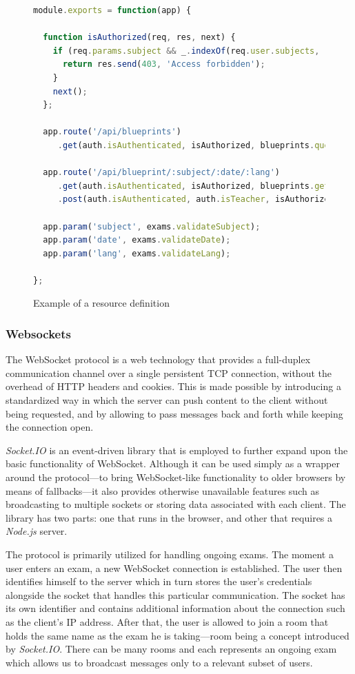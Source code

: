\documentclass[thesis=M,english,hidelinks]{FITthesis}[2012/10/20]
\begin{document}
\begin{figure}
  \begin{lstlisting}[language=JavaScript]
module.exports = function(app) {

  function isAuthorized(req, res, next) {
    if (req.params.subject && _.indexOf(req.user.subjects, req.params.subject) === -1) {
      return res.send(403, 'Access forbidden');
    }
    next();
  };

  app.route('/api/blueprints')
     .get(auth.isAuthenticated, isAuthorized, blueprints.query);

  app.route('/api/blueprint/:subject/:date/:lang')
     .get(auth.isAuthenticated, isAuthorized, blueprints.get)
     .post(auth.isAuthenticated, auth.isTeacher, isAuthorized, blueprints.create);

  app.param('subject', exams.validateSubject);
  app.param('date', exams.validateDate);
  app.param('lang', exams.validateLang);

};
  \end{lstlisting}
  \caption{Example of a resource definition}
  \label{fig:resource_example}
\end{figure}

      \subsubsection{Websockets}

The WebSocket protocol \cite{websocket} is a web technology that provides a full-duplex communication channel over a single persistent TCP connection, without the overhead of HTTP headers and cookies. This is made possible by introducing a standardized way in which the server can push content to the client without being requested, and by allowing to pass messages back and forth while keeping the connection open.

\textit{Socket.IO} \cite{socketio} is an event-driven library that is employed to further expand upon the basic functionality of WebSocket. Although it can be used simply as a wrapper around the protocol---to bring WebSocket-like functionality to older browsers by means of fallbacks---it also provides otherwise unavailable features such as broadcasting to multiple sockets or storing data associated with each client. The library has two parts: one that runs in the browser, and other that requires a \textit{Node.js} server.

The protocol is primarily utilized for handling ongoing exams. The moment a user enters an exam, a new WebSocket connection is established. The user then identifies himself to the server which in turn stores the user's credentials alongside the socket that handles this particular communication. The socket has its own identifier and contains additional information about the connection such as the client's IP address. After that, the user is allowed to join a room that holds the same name as the exam he is taking---room being a concept introduced by \textit{Socket.IO}. There can be many rooms and each represents an ongoing exam which allows us to broadcast messages only to a relevant subset of users.
\end{document}
